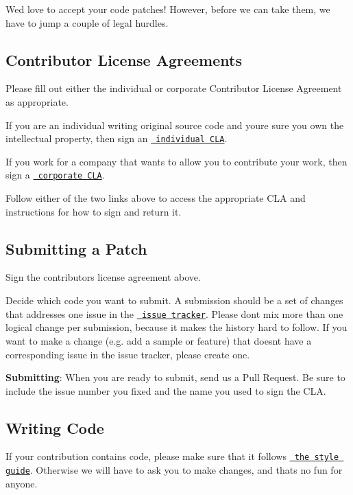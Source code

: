 We\textquotesingle{}d love to accept your code patches! However, before we can take them, we have to jump a couple of legal hurdles.

\subsection*{Contributor License Agreements}

Please fill out either the individual or corporate Contributor License Agreement as appropriate.


\begin{DoxyItemize}
\item If you are an individual writing original source code and you\textquotesingle{}re sure you own the intellectual property, then sign an \href{https://developers.google.com/open-source/cla/individual}{\texttt{ individual C\+LA}}.
\item If you work for a company that wants to allow you to contribute your work, then sign a \href{https://developers.google.com/open-source/cla/corporate}{\texttt{ corporate C\+LA}}.
\end{DoxyItemize}

Follow either of the two links above to access the appropriate C\+LA and instructions for how to sign and return it.

\subsection*{Submitting a Patch}


\begin{DoxyEnumerate}
\item Sign the contributors license agreement above.
\item Decide which code you want to submit. A submission should be a set of changes that addresses one issue in the \href{https://github.com/google/leveldb/issues}{\texttt{ issue tracker}}. Please don\textquotesingle{}t mix more than one logical change per submission, because it makes the history hard to follow. If you want to make a change (e.\+g. add a sample or feature) that doesn\textquotesingle{}t have a corresponding issue in the issue tracker, please create one.
\item {\bfseries{Submitting}}\+: When you are ready to submit, send us a Pull Request. Be sure to include the issue number you fixed and the name you used to sign the C\+LA.
\end{DoxyEnumerate}

\subsection*{Writing Code}

If your contribution contains code, please make sure that it follows \href{http://google.github.io/styleguide/cppguide.html}{\texttt{ the style guide}}. Otherwise we will have to ask you to make changes, and that\textquotesingle{}s no fun for anyone. 
